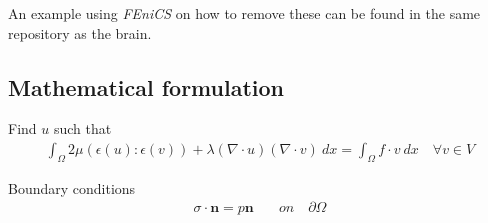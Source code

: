 \documentclass[epsfig,11pt]{article}
\begin{document}
An example using \emph{FEniCS} on how to remove these can be found in the same repository as the brain. 

\subsection{Mathematical formulation}

Find $u$ such that 
\begin{align*}
  \int_\Omega  2\mu (\epsilon(u) : \epsilon(v))  +\lambda (\nabla \cdot u) (\nabla \cdot v) \: dx = \int_\Omega f \cdot v \: dx \quad \forall v \in V
\end{align*} 

Boundary conditions
\begin{align*}
\sigma \cdot \mathbf{n} = p\mathbf{n} \quad &on \quad \partial \Omega
\end{align*}
\end{document}
